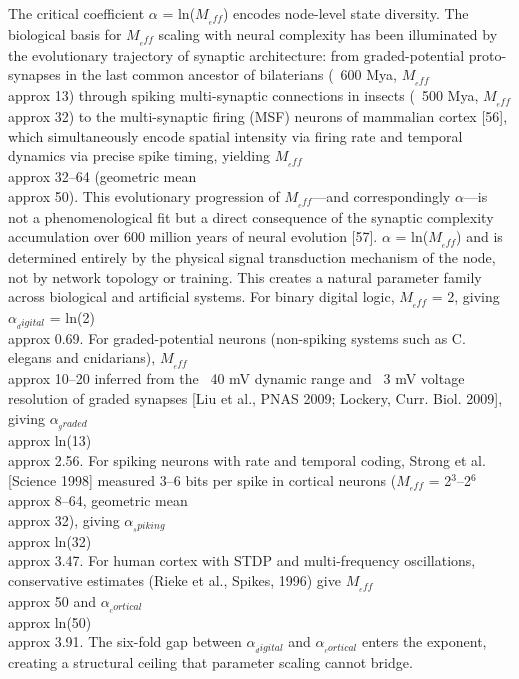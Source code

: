 \documentclass[a4paper,12pt]{article}
\begin{document}
The critical coefficient $\alpha$ = ln($M_{_eff}$) encodes node-level state diversity. The biological basis for $M_{_eff}$ scaling with neural complexity has been illuminated by the evolutionary trajectory of synaptic architecture: from graded-potential proto-synapses in the last common ancestor of bilaterians (~600 Mya, $M_{_eff}$  \\approx  13) through spiking multi-synaptic connections in insects (~500 Mya, $M_{_eff}$  \\approx  32) to the multi-synaptic firing (MSF) neurons of mammalian cortex [56], which simultaneously encode spatial intensity via firing rate and temporal dynamics via precise spike timing, yielding $M_{_eff}$  \\approx  32--64 (geometric mean  \\approx  50). This evolutionary progression of $M_{_eff}$---and correspondingly $\alpha$---is not a phenomenological fit but a direct consequence of the synaptic complexity accumulation over 600 million years of neural evolution [57]. $\alpha$ = ln($M_{_eff}$) and is determined entirely by the physical signal transduction mechanism of the node, not by network topology or training. This creates a natural parameter family across biological and artificial systems. For binary digital logic, $M_{_eff}$ = 2, giving $\alpha_{_digital}$ = ln(2)  \\approx  0.69. For graded-potential neurons (non-spiking systems such as C. elegans and cnidarians), $M_{_eff}$  \\approx  10--20 inferred from the ~40 mV dynamic range and ~3 mV voltage resolution of graded synapses [Liu et al., PNAS 2009; Lockery, Curr. Biol. 2009], giving $\alpha_{_graded}$  \\approx  ln(13)  \\approx  2.56. For spiking neurons with rate and temporal coding, Strong et al. [Science 1998] measured 3--6 bits per spike in cortical neurons ($M_{_eff}$ = 2$^3$--2$^6$  \\approx  8--64, geometric mean  \\approx  32), giving $\alpha_{_spiking}$  \\approx  ln(32)  \\approx  3.47. For human cortex with STDP and multi-frequency oscillations, conservative estimates (Rieke et al., Spikes, 1996) give $M_{_eff}$  \\approx  50 and $\alpha_{_cortical}$  \\approx  ln(50)  \\approx  3.91. The six-fold gap between $\alpha_{_digital}$ and $\alpha_{_cortical}$ enters the exponent, creating a structural ceiling that parameter scaling cannot bridge.
\end{document}
